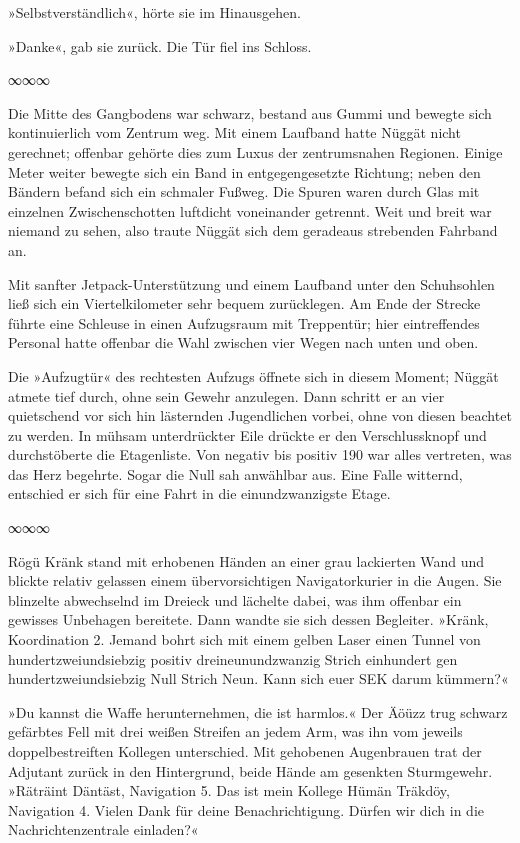 »Selbstverständlich«, hörte sie im Hinausgehen.

»Danke«, gab sie zurück. Die Tür fiel ins Schloss.

\begin{center}
∞∞∞
\end{center}

Die Mitte des Gangbodens war schwarz, bestand aus Gummi und bewegte sich kontinuierlich vom Zentrum weg. Mit einem Laufband hatte Nüggät nicht gerechnet; offenbar gehörte dies zum Luxus der zentrumsnahen Regionen. Einige Meter weiter bewegte sich ein Band in entgegengesetzte Richtung; neben den Bändern befand sich ein schmaler Fußweg. Die Spuren waren durch Glas mit einzelnen Zwischenschotten luftdicht voneinander getrennt. Weit und breit war niemand zu sehen, also traute Nüggät sich dem geradeaus strebenden Fahrband an.

Mit sanfter Jetpack-Unterstützung und einem Laufband unter den Schuhsohlen ließ sich ein Viertelkilometer sehr bequem zurücklegen. Am Ende der Strecke führte eine Schleuse in einen Aufzugsraum mit Treppentür; hier eintreffendes Personal hatte offenbar die Wahl zwischen vier Wegen nach unten und oben.

Die »Aufzugtür« des rechtesten Aufzugs öffnete sich in diesem Moment; Nüggät atmete tief durch, ohne sein Gewehr anzulegen. Dann schritt er an vier quietschend vor sich hin lästernden Jugendlichen vorbei, ohne von diesen beachtet zu werden. In mühsam unterdrückter Eile drückte er den Verschlussknopf und durchstöberte die Etagenliste. Von negativ bis positiv 190 war alles vertreten, was das Herz begehrte. Sogar die Null sah anwählbar aus. Eine Falle witternd, entschied er sich für eine Fahrt in die einundzwanzigste Etage.

\begin{center}
∞∞∞
\end{center}

Rögü Kränk stand mit erhobenen Händen an einer grau lackierten Wand und blickte relativ gelassen einem übervorsichtigen Navigatorkurier in die Augen. Sie blinzelte abwechselnd im Dreieck und lächelte dabei, was ihm offenbar ein gewisses Unbehagen bereitete. Dann wandte sie sich dessen Begleiter. »Kränk, Koordination 2. Jemand bohrt sich mit einem gelben Laser einen Tunnel von hundertzweiundsiebzig positiv dreineunundzwanzig Strich einhundert gen hundertzweiundsiebzig Null Strich Neun. Kann sich euer SEK darum kümmern?«

»Du kannst die Waffe herunternehmen, die ist harmlos.« Der Äöüzz trug schwarz gefärbtes Fell mit drei weißen Streifen an jedem Arm, was ihn vom jeweils doppelbestreiften Kollegen unterschied. Mit gehobenen Augenbrauen trat der Adjutant zurück in den Hintergrund, beide Hände am gesenkten Sturmgewehr. »Räträint Däntäst, Navigation 5. Das ist mein Kollege Hümän Träkdöy, Navigation 4. Vielen Dank für deine Benachrichtigung. Dürfen wir dich in die Nachrichtenzentrale einladen?«

